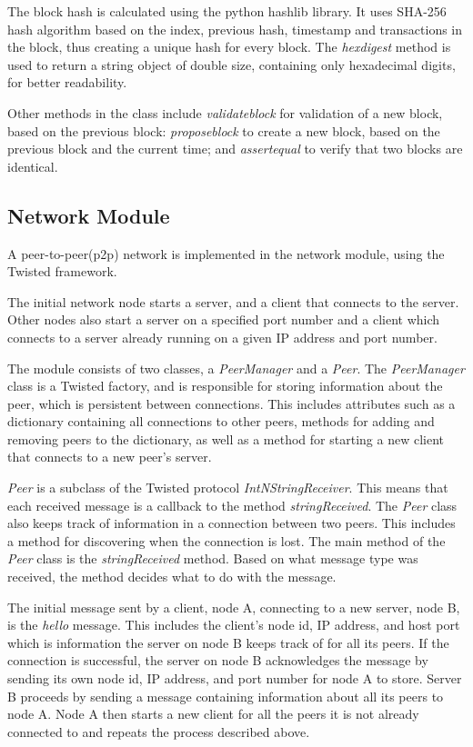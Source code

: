 The block hash is calculated using the python hashlib \cite{hashlib} library. It uses SHA-256 hash algorithm based on the index, previous hash, timestamp and transactions in the block, thus creating a unique hash for every block. The \textit{hexdigest} method is used to return a string object of double size, containing only hexadecimal digits, for better readability. 

Other methods in the class include \textit{validate\textunderscore block} for validation of a new block, based on the previous block: \textit{propose\textunderscore block} to create a new block, based on the previous block and the current time; and \textit{assert\textunderscore equal} to verify that two blocks are identical. 


\subsection{Network Module}
A peer-to-peer(p2p) network is implemented in the network module, using the Twisted \cite{twisted} framework. 

The initial network node starts a server, and a client that connects to the server. Other nodes also start a server on a specified port number and a client which connects to a server already running on a given IP address and port number. 

The module consists of two classes, a \textit{PeerManager} and a \textit{Peer}. The \textit{PeerManager} class is a Twisted factory, and is responsible for storing information about the peer, which is persistent between connections. This includes attributes such as a dictionary containing all connections to other peers, methods for adding and removing peers to the dictionary, as well as a method for starting a new client that connects to a new peer's server.

\textit{Peer} is a subclass of the Twisted protocol \textit{IntNStringReceiver}. This means that each received message is a callback to the method \textit{stringReceived}. The \textit{Peer} class also keeps track of information in a connection between two peers. This includes a method for discovering when the connection is lost. The main method of the \textit{Peer} class is the \textit{stringReceived} method. Based on what message type was received, the method decides what to do with the message. 

The initial message sent by a client, node A, connecting to a new server, node B, is the \textit{hello} message. This includes the client's node id, IP address, and host port which is information the server on node B keeps track of for all its peers. If the connection is successful, the server on node B acknowledges the message by sending its own node id, IP address, and port number for node A to store. Server B proceeds by sending a message containing information about all its peers to node A. Node A then starts a new client for all the peers it is not already connected to and repeats the process described above. 

